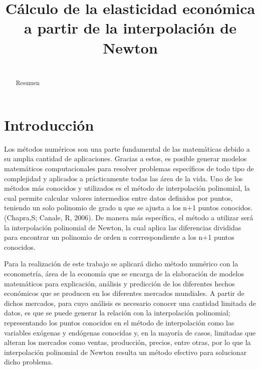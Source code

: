 \documentclass[conference]{IEEEtran}
\begin{document}
\title{Cálculo de la elasticidad económica a partir de la interpolación de Newton}

\author{
$\;$\\
}

\maketitle

\begin{abstract}
Resumen
\end{abstract}


\section{Introducción}
Los métodos numéricos son una parte fundamental de las matemáticas debido a su amplia cantidad de aplicaciones. Gracias a estos, es posible generar modelos matemáticos computacionales para resolver problemas específicos de todo tipo de complejidad y aplicados a prácticamente todas las área de la vida. Uno de los métodos más conocidos y utilizados es el método de interpolación polinomial, la cual permite calcular valores intermedios entre datos definidos por puntos, teniendo un solo polinomio de grado n que se ajusta a los n+1 puntos conocidos. (Chapra,S; Canale, R, 2006). De manera más específica, el método a utilizar será la interpolación polinomial de Newton, la cual aplica las diferencias divididas para encontrar un polinomio de orden n corrrespondiente a los n+1 puntos conocidos.

Para la realización de este trabajo se aplicará dicho método numérico con la econometría, área de la economía que se encarga de la elaboración de modelos matemáticos para explicación, análisis y predicción de los diferentes hechos económicos que se producen en los diferentes mercados mundiales. A partir de dichos mercados, para cuyo análisis es necesario conocer una cantidad limitada de datos, es que se puede generar la relación con la interpolación polinomial; representando los puntos conocidos en el método de interpolación como las variables exógenas y endógenas conocidas y, en la mayoría de casos, limitadas que alteran los mercados como ventas, producción, precios, entre otras, por lo que la interpolación polinomial de Newton resulta un método efectivo para solucionar dicho problema.
\end{document}
